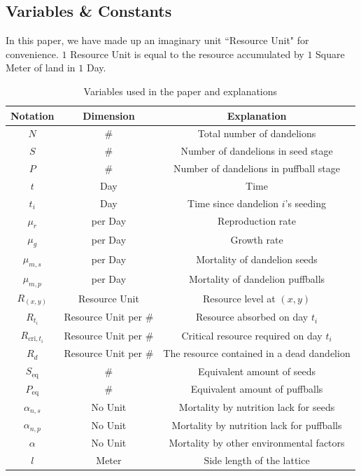 \documentclass[12pt]{article}
\begin{document}
\subsection{Variables \& Constants}
In this paper, we have made up an imaginary unit ``Resource Unit" for convenience. $1$ Resource Unit is equal to the resource accumulated by $1$ Square Meter of land in $1$ Day.
\begin{table}[H]
\centering
\caption{Variables used in the paper and explanations}
\label{variables}
\begin{tabular}{ccc}
    \toprule[2pt]
    Notation & Dimension & Explanation \\
    \midrule

    $N$ & \# & Total number of dandelions \\
    $S$ & \# & Number of dandelions in seed stage \\
    $P$ & \# & Number of dandelions in puffball stage \\
    $t$ & Day & Time \\
    $t_i$ & Day & Time since dandelion $i$'s seeding \\
    $\mu_r$ & per Day & Reproduction rate \\
    $\mu_g$ & per Day & Growth rate \\
    $\mu_{m,s}$ & per Day & Mortality of dandelion seeds \\
    $\mu_{m,p}$ & per Day & Mortality of dandelion puffballs \\
    $R_{(x,y)}$ & Resource Unit & Resource level at $(x,y)$ \\ %
    $R_{t_i}$ & Resource Unit per \# & Resource absorbed on day $t_i$ \\
    $R_{\text{cri},t_i}$ & Resource Unit per \# & Critical resource required on day $t_i$ \\
    $R_d$ & Resource Unit per \# & The resource contained in a dead dandelion \\
    $S_{\text{eq}}$ & \# & Equivalent amount of seeds \\
    $P_{\text{eq}}$ & \# & Equivalent amount of puffballs \\
    $\alpha_{n,s}$ & No Unit & Mortality by nutrition lack for seeds\\
    $\alpha_{n,p}$ & No Unit & Mortality by nutrition lack for puffballs\\
    $\alpha$ & No Unit & Mortality by other environmental factors\\ %
    $l$ & Meter & Side length of the lattice \\ %

\end{tabular}
\end{table}
\end{document}
